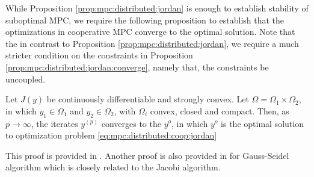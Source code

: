 While Proposition \ref{prop:mpc:distributed:jordan} is enough to
establish stability of suboptimal MPC, we require the following
proposition to establish that the optimizations in cooperative MPC
converge to the optimal solution. Note that the in contrast to
Proposition \ref{prop:mpc:distributed:jordan}, we require a much
stricter condition on the constraints in Proposition
\ref{prop:mpc:distributed:jordan:converge}, namely that, the
constraints be uncoupled. 

\begin{proposition}
\label{prop:mpc:distributed:jordan:converge}
Let $J(y)$ be continuously differentiable and strongly
convex. Let $\Omega = \Omega_1 \times \Omega_2$, in which $y_1 \in
\Omega_1$ and $y_2 \in \Omega_2$, with $\Omega_i$  convex, closed and compact. Then, as $p
\rightarrow \infty$, the iterates $y^{(p)}$ converges to the $y^o$, in
which $y^o$ is the optimal solution to optimization problem
\eqref{eq:mpc:distributed:coop:jordan}
\end{proposition}  
This proof is provided in  \citet{stewart:venkat:rawlings:wright:pannocchia:2010}. Another
proof is also provided in \citet[Prop 3.9]{bertsekas:tsitsiklis:1989}
for Gauss-Seidel algorithm which is closely related to the Jacobi
algorithm. 

